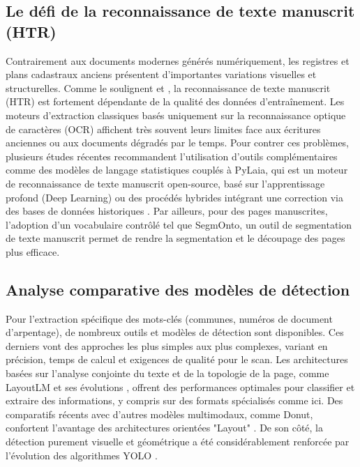 \documentclass[a4paper,11pt]{article}
\begin{document}
\subsection{Le défi de la reconnaissance de texte manuscrit (HTR)}
Contrairement aux documents modernes générés numériquement, les registres et plans cadastraux anciens présentent d'importantes variations visuelles et structurelles. Comme le soulignent \citet{stokes_partage_nodate} et \citet{chague_htr-united_nodate}, la reconnaissance de texte manuscrit (HTR) est fortement dépendante de la qualité des données d'entraînement. Les moteurs d'extraction classiques basés uniquement sur la reconnaissance optique de caractères (OCR) affichent très souvent leurs limites face aux écritures anciennes ou aux documents dégradés par le temps. Pour contrer ces problèmes, plusieurs études récentes recommandent l'utilisation d'outils complémentaires comme des modèles de langage statistiques couplés à PyLaia, qui est un moteur de reconnaissance de texte manuscrit open-source, basé sur l'apprentissage profond (Deep Learning) \citep{tarride_improving_2024} ou des procédés hybrides intégrant une correction via des bases de données historiques \citep{sang_ree-hdsc_2024}. Par ailleurs, pour des pages manuscrites, l'adoption d'un vocabulaire contrôlé tel que SegmOnto, un outil de segmentation de texte manuscrit \citep{gabay_segmonto_nodate} permet de rendre la segmentation et le découpage des pages plus efficace.

\subsection{Analyse comparative des modèles de détection}
Pour l'extraction spécifique des mots-clés (communes, numéros de document d'arpentage), de nombreux outils et modèles de détection sont disponibles. Ces derniers vont des approches les plus simples aux plus complexes, variant en précision, temps de calcul et exigences de qualité pour le scan. Les architectures basées sur l'analyse conjointe du texte et de la topologie de la page, comme LayoutLM \citep{xu_layoutlm_2020} et ses évolutions \citep{luo_layoutllm_2024}, offrent des performances optimales pour classifier et extraire des informations, y compris sur des formats spécialisés comme ici. Des comparatifs récents avec d'autres modèles multimodaux, comme Donut, confortent l'avantage des architectures orientées "Layout" \citep{bajrami_comprehensive_2023}. De son côté, la détection purement visuelle et géométrique a été considérablement renforcée par l'évolution des algorithmes YOLO \citep{jiang_review_2022}.
\end{document}
